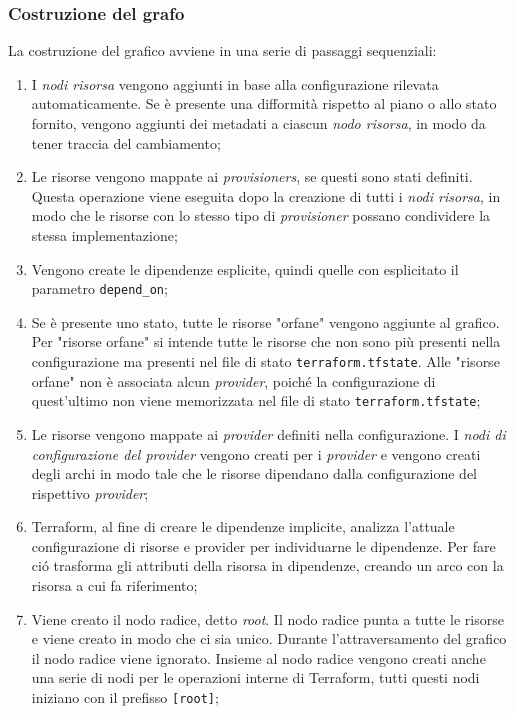 \documentclass[12pt, a4paper, titlepage]{article}
\begin{document}
\subsubsection{Costruzione del grafo} 
La costruzione del grafico avviene in una serie di passaggi sequenziali:

\begin{enumerate}
	\item I \textit{nodi risorsa} vengono aggiunti in base alla configurazione rilevata automaticamente. Se è presente una difformità rispetto al piano o allo stato fornito, vengono aggiunti dei metadati a ciascun \textit{nodo risorsa}, in modo da tener traccia del cambiamento;

	\item Le risorse vengono mappate ai \textit{provisioners}, se questi sono stati definiti. Questa operazione viene eseguita dopo la creazione di tutti i \textit{nodi risorsa}, in modo che le risorse con lo stesso tipo di \textit{provisioner} possano condividere la stessa implementazione;
	
	\item Vengono create le dipendenze esplicite, quindi quelle con esplicitato il parametro \texttt{depend\_on};

	\item Se è presente uno stato, tutte le risorse "orfane" vengono aggiunte al grafico. Per "risorse orfane" si intende tutte le risorse che non sono più presenti nella 	configurazione ma presenti nel file di stato \texttt{terraform.tfstate}. Alle "risorse  orfane" non è associata alcun \textit{provider}, poiché la configurazione di quest'ultimo non viene memorizzata nel file di stato \texttt{terraform.tfstate};

	\item Le risorse vengono mappate ai \textit{provider} definiti nella configurazione. I \textit{nodi di configurazione del provider} vengono creati per i \textit{provider} e vengono creati degli archi in modo tale che le risorse dipendano dalla configurazione del rispettivo \textit{provider};

	\item Terraform, al fine di creare le dipendenze implicite, analizza l'attuale 	configurazione di risorse e provider per individuarne le dipendenze. Per fare ció trasforma gli attributi della risorsa in dipendenze, creando un arco con la risorsa a cui fa riferimento; 

	\item Viene creato il nodo radice, detto \textit{root}. Il nodo radice punta a tutte le risorse e viene creato in modo che ci sia unico. Durante l'attraversamento del grafico il nodo radice viene ignorato. Insieme al nodo radice vengono creati anche una serie di nodi per le operazioni interne di Terraform, tutti questi nodi iniziano con il prefisso \texttt{[root]};


\end{enumerate}
\end{document}
